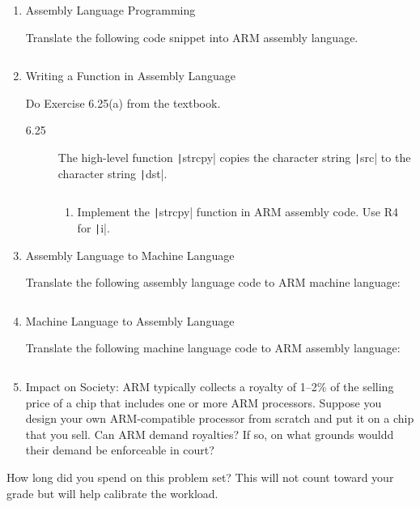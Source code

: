 \documentclass{ps}
\date{2019}
\author{}
\begin{document}
\begin{enumerate}
\item Assembly Language Programming

  Translate the following code snippet into ARM assembly language.

  \inputminted{c}{code/assembly-language-programming.c}

  \begin{solution}
  \end{solution}

\item Writing a Function in Assembly Language

  Do Exercise 6.25(a) from the textbook.
  \begin{description}
  \item[6.25] The high-level function \texttt|strcpy| copies
    the character string \texttt|src| to the character string
    \texttt|dst|.

    \inputminted{c}{code/writing-a-function-in-assembly-language.c}

    \begin{enumerate}[label=(\alph*)]
    \item Implement the \texttt|strcpy| function in ARM
      assembly code.  Use R4 for \texttt|i|.

      \begin{solution}
      \end{solution}
    \end{enumerate}
  \end{description}

\item Assembly Language to Machine Language

  Translate the following assembly language code to ARM machine
  language:

  \inputminted{text}{code/assembly-language-to-machine-language.arm}


  \begin{solution}
  \end{solution}

\item Machine Language to Assembly Language

  Translate the following machine language code to ARM assembly
  language:

  \inputminted{text}{code/machine-language-to-assembly-language}

  \begin{solution}
  \end{solution}

\item Impact on Society: ARM typically collects a royalty of 1--2\% of
  the selling price of a chip that includes one or more ARM
  processors.  Suppose you design your own ARM-compatible processor
  from scratch and put it on a chip that you sell.  Can ARM demand
  royalties?  If so, on what grounds wouldd their demand be
  enforceable in court?

  \begin{solution}
  \end{solution}
\end{enumerate}

How long did you spend on this problem set?  This will not count
toward your grade but will help calibrate the workload.
\begin{solution}
\end{solution}
\end{document}
